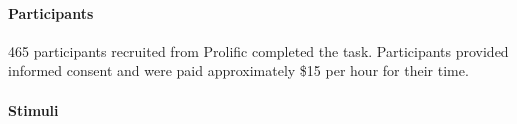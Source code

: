 \documentclass[10pt,letterpaper]{article}
\begin{document}
\paragraph{Participants}
465 participants recruited from Prolific completed the task. 
Participants provided informed consent and were paid approximately \$15 per hour for their time.

\paragraph{Stimuli} 


\end{document}
